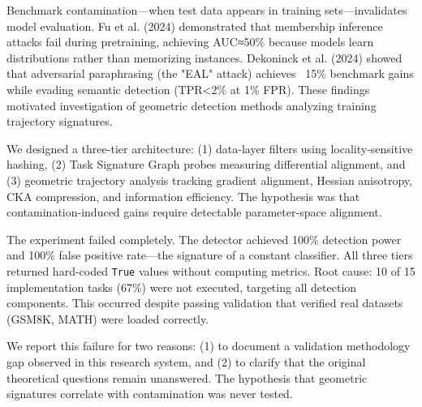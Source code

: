 
Benchmark contamination—when test data appears in training sets—invalidates model evaluation. Fu et al. (2024) demonstrated that membership inference attacks fail during pretraining, achieving AUC≈50\% because models learn distributions rather than memorizing instances. Dekoninck et al. (2024) showed that adversarial paraphrasing (the "EAL" attack) achieves ~15\% benchmark gains while evading semantic detection (TPR<2\% at 1\% FPR). These findings motivated investigation of geometric detection methods analyzing training trajectory signatures.

We designed a three-tier architecture: (1) data-layer filters using locality-sensitive hashing, (2) Task Signature Graph probes measuring differential alignment, and (3) geometric trajectory analysis tracking gradient alignment, Hessian anisotropy, CKA compression, and information efficiency. The hypothesis was that contamination-induced gains require detectable parameter-space alignment.

The experiment failed completely. The detector achieved 100\% detection power and 100\% false positive rate—the signature of a constant classifier. All three tiers returned hard-coded \texttt{True} values without computing metrics. Root cause: 10 of 15 implementation tasks (67\%) were not executed, targeting all detection components. This occurred despite passing validation that verified real datasets (GSM8K, MATH) were loaded correctly.

We report this failure for two reasons: (1) to document a validation methodology gap observed in this research system, and (2) to clarify that the original theoretical questions remain unanswered. The hypothesis that geometric signatures correlate with contamination was never tested.
